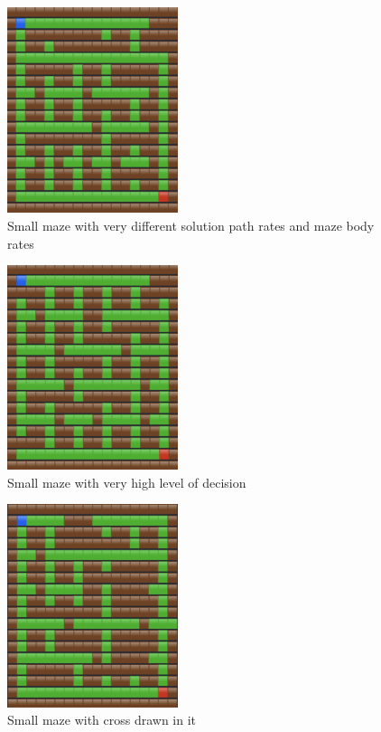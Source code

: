 \documentclass[review]{elsarticle}
\begin{document}
\begin{figure}
	\includegraphics[width=50mm]{maze_diff.png}
	\centering
	\caption{Small maze with very different solution path rates and maze body rates}
	\label{fig:maze_diff}
\end{figure}

\begin{figure}
	\includegraphics[width=50mm]{maze_dr.png}
	\centering
	\caption{Small maze with very high level of decision}
	\label{fig:maze_dr}
\end{figure}

\begin{figure}
	\includegraphics[width=50mm]{maze_draw.png}
	\centering
	\caption{Small maze with cross drawn in it}
	\label{fig:maze_draw}
\end{figure}
\end{document}
